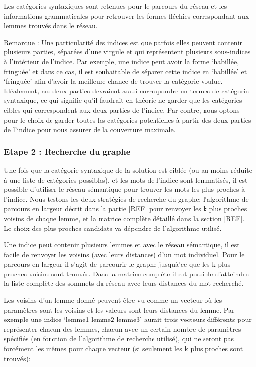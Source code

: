 Les catégories syntaxiques sont retenues pour le parcours du réseau et les informations grammaticales pour retrouver les formes fléchies correspondant aux lemmes trouvés dans le réseau.

Remarque : Une particularité des indices est que parfois elles peuvent contenir plusieurs parties, séparées d'une virgule et qui représentent plusieurs sous-indices à l'intérieur de l'indice. Par exemple, une indice peut avoir la forme \lq{habillée, fringuée}\rq{} et dans ce cas, il est souhaitable de séparer cette indice en \lq{habillée}\rq{} et \lq{fringuée}\rq{} afin d'avoir la meilleure chance de trouver la catégorie voulue. Idéalement, ces deux parties devraient aussi correspondre en termes de catégorie syntaxique, ce qui signifie qu'il faudrait en théorie ne garder que les catégories cibles qui correspondent aux deux parties de l'indice. Par contre, nous optons pour le choix de garder toutes les catégories potentielles à partir des deux parties de l'indice pour nous assurer de la couverture maximale. 

\subsubsection{Etape 2 : Recherche du graphe}

Une fois que la catégorie syntaxique de la solution est ciblée (ou au moins réduite à une liste de catégories possibles), et les mots de l'indice sont lemmatisés, il est possible d'utiliser le réseau sémantique pour trouver les mots les plus proches à l'indice. Nous testons les deux stratégies de recherche du graphe: l'algorithme de parcours en largeur décrit dans la partie [REF] pour renvoyer les k plus proches voisins de chaque lemme, et la matrice complète détaillé dans la section [REF]. Le choix des plus proches candidats va dépendre de l'algorithme utilisé.

Une indice peut contenir plusieurs lemmes et avec le réseau sémantique, il est facile de renvoyer les voisins (avec leurs distances) d'un mot individuel. Pour le parcours en largeur il s'agit de parcourir le graphe jusquà'ce que les k plus proches voisins sont trouvés. Dans la matrice complète il est possible d'atteindre la liste complète des sommets du réseau avec leurs distances du mot recherché. 

Les voisins d'un lemme donné peuvent être vu comme un vecteur où les paramètres sont les voisins et les valeurs sont leurs distances du lemme. Par exemple une indice \lq{lemme1 lemme2 lemme3}\rq{} aurait trois vecteurs différents pour représenter chacun des lemmes, chacun avec un certain nombre de paramètres spécifiés (en fonction de l'algorithme de recherche utilisé), qui ne seront pas forcément les mêmes pour chaque vecteur (si seulement les k plus proches sont trouvés):

